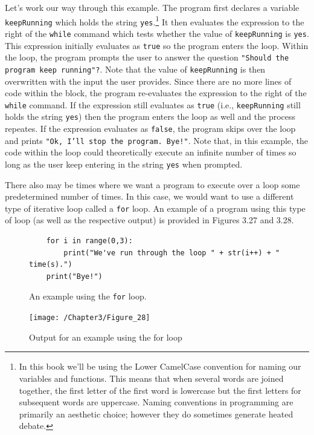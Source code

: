 \documentclass{book}
\begin{document}
Let's work our way through this example. The program first declares a variable \texttt{keepRunning} which holds the string \texttt{yes}.\footnote{In this book we'll be using the Lower CamelCase convention for naming our variables and functions. This means that when several words are joined together, the first letter of the first word is lowercase but the first letters for subsequent words are uppercase. Naming conventions in programming are primarily an aesthetic choice; however they do sometimes generate heated debate.} It then evaluates the expression to the right of the \texttt{while} command which tests whether the value of \texttt{keepRunning} is \texttt{yes}. This expression initially evaluates as \texttt{true} so the program enters the loop. Within the loop, the program prompts the user to answer the question \texttt{"Should the program keep running"?}. Note that the value of \texttt{keepRunning} is then overwritten with the input the user provides. Since there are no more lines of code within the block, the program re-evaluates the expression to the right of the \texttt{while} command. If the expression still evaluates as \texttt{true} (i.e., \texttt{keepRunning} still holds the string \texttt{yes}) then the program enters the loop as well and the process repeates. If the expression evaluates as \texttt{false}, the program skips over the loop and prints \texttt{"Ok, I'll stop the program. Bye!"}. Note that, in this example, the code within the loop could theoretically execute an infinite number of times so long as the user keep entering in the string \texttt{yes} when prompted.

There also may be times where we want a program to execute over a loop some predetermined number of times. In this case, we would want to use a different type of iterative loop called a \texttt{for} loop. An example of a program using this type of loop (as well as the respective output) is provided in Figures 3.27 and 3.28.

\begin{figure}[h]
	\caption{An example using the \texttt{for} loop.}
	\begin{lstlisting}
	for i in range(0,3):
		print("We've run through the loop " + str(i++) + " time(s).")
	print("Bye!")
	\end{lstlisting}
\end{figure}

\begin{figure}[h]
	\caption{Output for an example using the for loop}
	\centering\texttt{[image: /Chapter3/Figure\_28]}
\end{figure}
\end{document}
